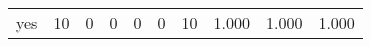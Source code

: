 \begin{longtable}{lp{2.0cm}p{2.0cm}p{2.0cm}p{2.0cm}p{2.0cm}p{2.0cm}p{2.0cm}p{2.0cm}p{2.0cm}}
yes       &                     10 &                                             0 &                                            0 &                                           0 &                                            0 &                                         10 &                                1.000 &                                  1.000 &                                1.000 \\
\end{longtable}
